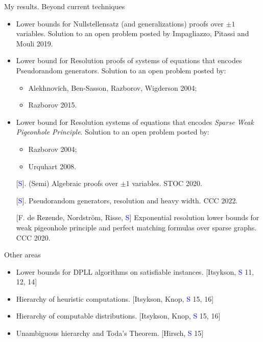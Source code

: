 \begin{frame}{My results. Beyond current techniques}
        
    \begin{itemize}
        \item Lower bounds for Nullstellensatz (and generalizations) proofs over $\pm 1$
            variables. Solution to an open problem posted by Impagliazzo, Pitassi and Mouli 2019.
        \pause
        \item Lower bound for Resolution proofs of systems of equations that encodes Pseudorandom
            generators. Solution to an open problem posted by:
            \begin{itemize}
                \item Alekhnovich, Ben-Sasson, Razborov, Wigderson 2004;
                \item Razborov 2015.
            \end{itemize}
        \pause
        \item Lower bound for Resolution systems of equations that encodes \textit{Sparse Weak Pigeonhole
            Principle}. Solution to an open problem posted by:
            \begin{itemize}
                \item Razborov 2004;
                \item Urquhart 2008.
            \end{itemize}
    \end{itemize}

    \begin{enumerate}
        \item[] [\textcolor{blue}{S}]. (Semi) Algebraic proofs over $\pm 1$ variables. STOC 2020.
        \item[] [\textcolor{blue}{S}]. Pseudorandom generators, resolution and
            heavy width. CCC 2022.
        \item[] [F. de Rezende, Nordstr{\"{o}}m, Risse, \textcolor{blue}{S}] Exponential resolution lower
            bounds for weak pigeonhole principle and perfect matching formulas over sparse graphs. CCC
            2020.
    \end{enumerate}
\end{frame}

\begin{frame}{Other areas}

    \begin{itemize}
        \item Lower bounds for DPLL algorithms on satisfiable instances. [Itsykson, \textcolor{blue}{S} 11, 12, 14]
        \item Hierarchy of heuristic computations. [Itsykson, Knop, \textcolor{blue}{S} 15, 16]
        \item Hierarchy of computable distributions. [Itsykson, Knop, \textcolor{blue}{S} 15, 16]
        \item Unambiguous hierarchy and Toda's Theorem. [Hirsch, \textcolor{blue}{S} 15]
    \end{itemize}
    
\end{frame}



